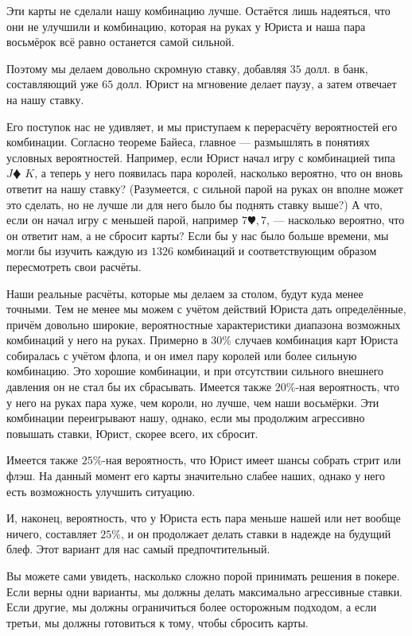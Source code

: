 Эти карты не сделали нашу комбинацию лучше. Остаётся лишь надеяться, что они не улучшили и комбинацию, которая на руках у Юриста и наша пара восьмёрок всё равно останется самой сильной.

Поэтому мы делаем довольно скромную ставку, добавляя $35$ долл. в банк, составляющий уже $65$ долл. Юрист на мгновение делает паузу, а затем отвечает на нашу ставку.

Его поступок нас не удивляет, и мы приступаем к перерасчёту вероятностей его комбинации. Согласно теореме Байеса, главное --- размышлять в понятиях условных вероятностей. Например, если Юрист начал игру с комбинацией типа $J \vardiamond$  $K$\spadesuit, а теперь у него появилась пара королей, насколько вероятно, что он вновь ответит на нашу ставку? (Разумеется, с сильной парой на руках он вполне может это сделать, но не лучше ли для него было бы поднять ставку выше?) А что, если он начал игру с меньшей парой, например $ 7\varheart, 7$\spadesuit, --- насколько вероятно, что он ответит нам, а не сбросит карты? Если бы у нас было больше времени, мы могли бы изучить каждую из $1326$ комбинаций и соответствующим образом пересмотреть свои расчёты.

Наши реальные расчёты, которые мы делаем за столом, будут куда менее точными. Тем не менее мы можем с учётом действий Юриста дать определённые, причём довольно широкие, вероятностные характеристики диапазона возможных комбинаций у него на руках. Примерно в $30\%$ случаев комбинация карт Юриста собиралась с учётом флопа, и он имел пару королей или более сильную комбинацию. Это хорошие комбинации, и при отсутствии сильного внешнего давления он не стал бы их сбрасывать. Имеется также $20\%$-ная вероятность, что у него на руках пара хуже, чем короли, но лучше, чем наши восьмёрки. Эти комбинации переигрывают нашу, однако, если мы продолжим агрессивно повышать ставки, Юрист, скорее всего, их сбросит.

Имеется также $25\%$-ная вероятность, что Юрист имеет шансы собрать стрит или флэш. На данный момент его карты значительно слабее наших, однако у него есть возможность улучшить ситуацию.

И, наконец, вероятность, что у Юриста есть пара меньше нашей или нет вообще ничего, составляет $25\%$, и он продолжает делать ставки в надежде на будущий блеф. Этот вариант для нас самый предпочтительный.

Вы можете сами увидеть, насколько сложно порой принимать решения в покере. Если верны одни варианты, мы должны делать максимально агрессивные ставки. Если другие, мы должны ограничиться более осторожным подходом, а если третьи, мы должны готовиться к тому, чтобы сбросить карты.

